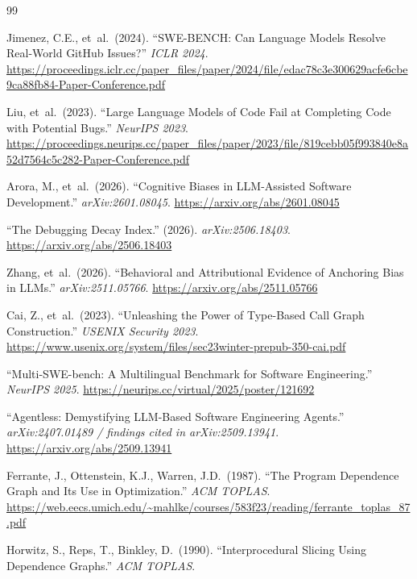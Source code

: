 \documentclass[12pt,a4paper]{article}
\begin{document}
\begin{thebibliography}{99}
\small

  Jimenez, C.E., et~al.\ (2024).
  ``SWE-BENCH: Can Language Models Resolve Real-World GitHub Issues?''
  \textit{ICLR 2024}.
  \url{https://proceedings.iclr.cc/paper_files/paper/2024/file/edac78c3e300629acfe6cbe9ca88fb84-Paper-Conference.pdf}

  Liu, et~al.\ (2023).
  ``Large Language Models of Code Fail at Completing Code with Potential Bugs.''
  \textit{NeurIPS 2023}.
  \url{https://proceedings.neurips.cc/paper_files/paper/2023/file/819cebb05f993840e8a52d7564c5c282-Paper-Conference.pdf}

  Arora, M., et~al.\ (2026).
  ``Cognitive Biases in LLM-Assisted Software Development.''
  \textit{arXiv:2601.08045}.
  \url{https://arxiv.org/abs/2601.08045}

  ``The Debugging Decay Index.'' (2026).
  \textit{arXiv:2506.18403}.
  \url{https://arxiv.org/abs/2506.18403}

  Zhang, et~al.\ (2026).
  ``Behavioral and Attributional Evidence of Anchoring Bias in LLMs.''
  \textit{arXiv:2511.05766}.
  \url{https://arxiv.org/abs/2511.05766}

  Cai, Z., et~al.\ (2023).
  ``Unleashing the Power of Type-Based Call Graph Construction.''
  \textit{USENIX Security 2023}.
  \url{https://www.usenix.org/system/files/sec23winter-prepub-350-cai.pdf}

  ``Multi-SWE-bench: A Multilingual Benchmark for Software Engineering.''
  \textit{NeurIPS 2025}.
  \url{https://neurips.cc/virtual/2025/poster/121692}

  ``Agentless: Demystifying LLM-Based Software Engineering Agents.''
  \textit{arXiv:2407.01489 / findings cited in arXiv:2509.13941}.
  \url{https://arxiv.org/abs/2509.13941}

  Ferrante, J., Ottenstein, K.J., Warren, J.D.\ (1987).
  ``The Program Dependence Graph and Its Use in Optimization.''
  \textit{ACM TOPLAS}.
  \url{https://web.eecs.umich.edu/~mahlke/courses/583f23/reading/ferrante_toplas_87.pdf}

  Horwitz, S., Reps, T., Binkley, D.\ (1990).
  ``Interprocedural Slicing Using Dependence Graphs.''
  \textit{ACM TOPLAS}.


\end{thebibliography}
\end{document}
